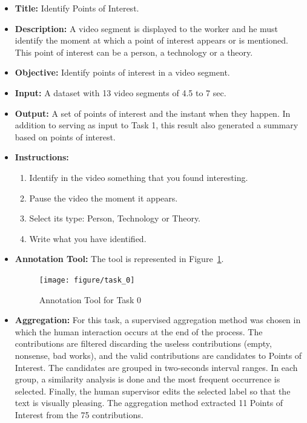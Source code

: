 \begin{itemize}
\item \textbf{Title:} Identify Points of Interest.

\item \textbf{Description:} A video segment is displayed to the worker and he must identify the moment at which a point of interest appears or is mentioned. This point of interest can be a person, a technology or a theory.

\item \textbf{Objective:} Identify points of interest in a video segment.


\item \textbf{Input:} A dataset with 13 video segments of 4.5 to 7 sec.


\item \textbf{Output:} A set of points of interest and the instant when they happen. In addition to serving as input to Task 1, this result also generated a summary based on points of interest.


\item \textbf{Instructions:} \begin{enumerate}
	\item Identify in the video something that you found interesting.
	\item Pause the video the moment it appears.
	\item Select its type: Person, Technology or Theory.
	\item Write what you have identified. 
\end{enumerate}

\item \textbf{Annotation Tool:} The tool is represented in Figure~\ref{task_0}.
\begin{figure}[h!]
	\centerline{\texttt{[image: figure/task\_0]}}
	\caption{Annotation Tool for Task 0}
	\label{task_0}
\end{figure}

\item \textbf{Aggregation:} For this task, a supervised aggregation method was chosen in which the human interaction occurs at the end of the process. The contributions are filtered discarding the useless contributions (empty, nonsense, bad works), and the valid contributions are candidates to Points of Interest. The candidates are grouped in two-seconds interval ranges. In each group, a similarity analysis is done and the most frequent occurrence is selected. Finally, the human supervisor edits the selected label so that the text is visually pleasing. The aggregation method extracted 11 Points of Interest from the 75 contributions.

\end{itemize}



